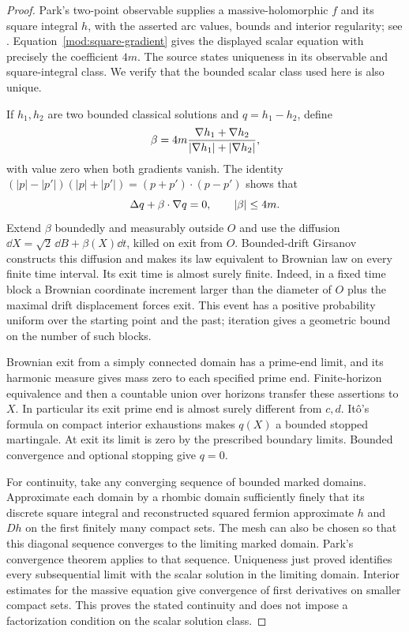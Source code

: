 \begin{proof}
Park's two-point observable supplies a massive-holomorphic $f$ and
its square integral $h$, with the asserted arc values, bounds and
interior regularity; see \cite[Theorem~1.1, Definition~5.2,
Proposition~5.8]{Park}. Equation~\eqref{mod:square-gradient} gives
the displayed scalar equation with precisely the coefficient $4m$.
The source states uniqueness in its observable and square-integral
class. We verify that the bounded scalar class used here is also
unique.

If $h_1,h_2$ are two bounded classical solutions and $q=h_1-h_2$,
define
\[
 \beta=4m\frac{\nabla h_1+\nabla h_2}
                    {|\nabla h_1|+|\nabla h_2|},
\]
with value zero when both gradients vanish. The identity
$(|p|-|p'|)(|p|+|p'|)=(p+p')\cdot(p-p')$ shows that
\[
 \Delta q+\beta\cdot\nabla q=0,\qquad |\beta|\le4m.
\]
Extend $\beta$ boundedly and measurably outside $O$ and use the
diffusion $\dd X=\sqrt2\,\dd B+\beta(X)\dd t$, killed on exit
from $O$. Bounded-drift Girsanov constructs this diffusion and makes
its law equivalent to Brownian law on every finite time interval.
Its exit time is almost surely finite. Indeed, in a fixed time block
a Brownian coordinate increment larger than the diameter of $O$
plus the maximal drift displacement forces exit. This event has a
positive probability uniform over the starting point and the past;
iteration gives a geometric bound on the number of such blocks.

Brownian exit from a simply connected domain has a prime-end limit,
and its harmonic measure gives mass zero to each specified prime
end. Finite-horizon equivalence and then a countable union over
horizons transfer these assertions to $X$. In particular its exit
prime end is almost surely different from $c,d$. It\^o's formula on
compact interior exhaustions makes $q(X)$ a bounded stopped
martingale. At exit its limit is zero by the prescribed boundary
limits. Bounded convergence and optional stopping give $q=0$.

For continuity, take any converging sequence of bounded marked
domains. Approximate each domain by a rhombic domain sufficiently
finely that its discrete square integral and reconstructed squared
fermion approximate $h$ and $Dh$ on the first finitely many compact
sets. The mesh can also be chosen so that this diagonal
sequence converges to the limiting marked domain. Park's convergence
theorem applies to that sequence. Uniqueness just proved identifies
every subsequential limit with the scalar solution in the limiting
domain. Interior estimates for the massive equation give convergence
of first derivatives on smaller compact sets. This proves the stated
continuity and does not impose a factorization condition on the
scalar solution class.
\end{proof}


